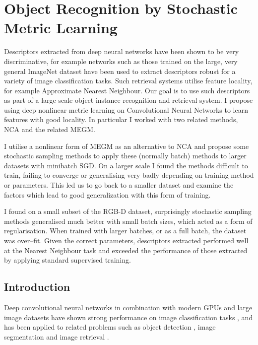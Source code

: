 
\chapter{Object Recognition by Stochastic Metric Learning}
\label{chap:metric} 



Descriptors extracted from deep neural networks have been shown to be very discriminative,
for example networks such as those trained on the large, very general ImageNet dataset have been used to extract descriptors robust for a variety of image classification tasks. Such retrieval systems utilise feature locality, for example Approximate Nearest Neighbour. Our goal is to use such descriptors as part of a large scale object instance recognition and retrieval system. I propose using deep nonlinear metric learning on Convolutional Neural Networks to learn features with good locality. In particular I worked with two related methods, \gls{NCA} and the related \gls{MEGM}.

I utilise a nonlinear form of \gls{MEGM} as an alternative to \gls{NCA} and propose some stochastic sampling methods to apply these (normally batch) methods to larger datasets with minibatch \gls{SGD}. On a larger scale I found the methods difficult to train, failing to converge or generalising very badly depending on training method or parameters. This led us to go back to a smaller dataset and examine the factors which lead to good generalization with this form of training.
  
I found on a small subset of the RGB-D dataset, surprisingly stochastic sampling methods generalised much better with small batch sizes, which acted as a form of regularisation. When trained with larger batches, or as a full batch, the dataset was over--fit. Given the correct parameters, descriptors extracted performed well at the Nearest Neighbour task and exceeded the performance of those extracted by applying standard supervised training.





\section{Introduction}

Deep convolutional neural networks in combination with modern \gls{GPU}s and large image datasets have shown strong performance on image classification tasks \cite {Krizhevsky2012}, and has been applied to related problems such as object detection \cite{Sermanet2013}, image segmentation \cite{Masci2013} and image retrieval \cite{Razavian2014}.


